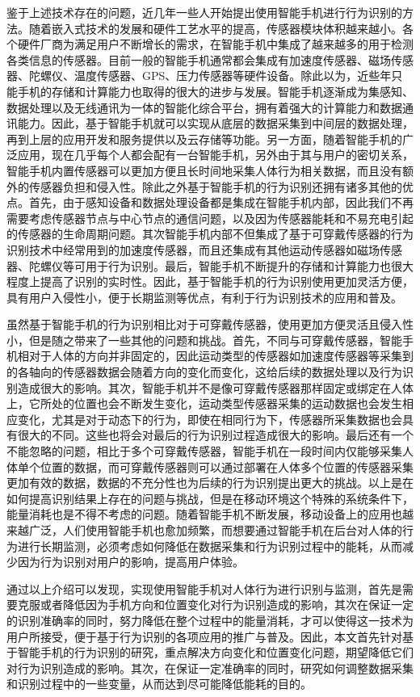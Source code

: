 \par 鉴于上述技术存在的问题，近几年一些人开始提出使用智能手机进行行为识别的方法。随着嵌入式技术的发展和硬件工艺水平的提高，传感器模块体积越来越小。各个硬件厂商为满足用户不断增长的需求，在智能手机中集成了越来越多的用于检测各类信息的传感器。目前一般的智能手机通常都会集成有加速度传感器、磁场传感器、陀螺仪、温度传感器、GPS、压力传感器等硬件设备。除此以为，近些年只能手机的存储和计算能力也取得的很大的进步与发展。智能手机逐渐成为集感知、数据处理以及无线通讯为一体的智能化综合平台，拥有着强大的计算能力和数据通讯能力。因此，基于智能手机就可以实现从底层的数据采集到中间层的数据处理，再到上层的应用开发和服务提供以及云存储等功能。另一方面，随着智能手机的广泛应用，现在几乎每个人都会配有一台智能手机，另外由于其与用户的密切关系，智能手机内置传感器可以更加方便且长时间地采集人体行为相关数据，而且没有额外的传感器负担和侵入性。除此之外基于智能手机的行为识别还拥有诸多其他的优点。首先，由于感知设备和数据处理设备都是集成在智能手机内部，因此我们不再需要考虑传感器节点与中心节点的通信问题，以及因为传感器能耗和不易充电引起的传感器的生命周期问题。其次智能手机内部不但集成了基于可穿戴传感器的行为识别技术中经常用到的加速度传感器，而且还集成有其他运动传感器如磁场传感器、陀螺仪等可用于行为识别。最后，智能手机不断提升的存储和计算能力也很大程度上提高了识别的实时性。因此，基于智能手机的行为识别使用更加灵活方便，具有用户入侵性小，便于长期监测等优点，有利于行为识别技术的应用和普及。
\par 虽然基于智能手机的行为识别相比对于可穿戴传感器，使用更加方便灵活且侵入性小，但是随之带来了一些其他的问题和挑战。首先，不同与可穿戴传感器，智能手机相对于人体的方向并非固定的，因此运动类型的传感器如加速度传感器等采集到的各轴向的传感器数据会随着方向的变化而变化，这给后续的数据处理以及行为识别造成很大的影响。其次，智能手机并不是像可穿戴传感器那样固定或绑定在人体上，它所处的位置也会不断发生变化，运动类型传感器采集的运动数据也会发生相应变化，尤其是对于动态下的行为，即使在相同行为下，传感器所采集数据也会具有很大的不同。这些也将会对最后的行为识别过程造成很大的影响。最后还有一个不能忽略的问题，相比于多个可穿戴传感器，智能手机在一段时间内仅能够采集人体单个位置的数据，而可穿戴传感器则可以通过部署在人体多个位置的传感器采集更加有效的数据，数据的不充分性也为后续的行为识别提出更大的挑战。以上是在如何提高识别结果上存在的问题与挑战，但是在移动环境这个特殊的系统条件下，能量消耗也是不得不考虑的问题。随着智能手机不断发展，移动设备上的应用也越来越广泛，人们使用智能手机也愈加频繁，而想要通过智能手机在后台对人体的行为进行长期监测，必须考虑如何降低在数据采集和行为识别过程中的能耗，从而减少因为行为识别对用户的影响，提高用户体验。
\par 通过以上介绍可以发现，实现使用智能手机对人体行为进行识别与监测，首先是需要克服或者降低因为手机方向和位置变化对行为识别造成的影响，其次在保证一定的识别准确率的同时，努力降低在整个过程中的能量消耗，才可以使得这一技术为用户所接受，便于基于行为识别的各项应用的推广与普及。因此，本文首先针对基于智能手机的行为识别的研究，重点解决方向变化和位置变化问题，期望降低它们对行为识别造成的影响。其次，在保证一定准确率的同时，研究如何调整数据采集和识别过程中的一些变量，从而达到尽可能降低能耗的目的。

